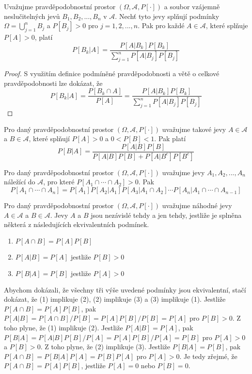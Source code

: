 \begin{theorem} 
Uvažujme pravděpodobnostní prostor $(\Omega, \mathscr{A}, P[\cdot])$ a soubor vzájemně neslučitelných jevů $B_1, B_2, ..., B_n$ v $\mathscr{A}$. Nechť tyto jevy splňují podmínky $\Omega = \bigcup_{j=1}^n B_j$ a $P[B_j] > 0$ pro $j = 1, 2, ..., n$. Pak pro každé $A \in \mathscr{A}$, které splňuje  $P[A] > 0$, platí
\begin{equation*}
P[B_k|A]=\frac{P[A|B_k]P[B_k]}{\sum_{j=1}^nP[A|B_j]P[B_j]}
\end{equation*}
\begin{proof}
S využitím definice podmíněné pravděpodobnosti a větě o celkové pravděpodobnosti lze dokázat, že
\begin{equation*}
P[B_k|A]=\frac{P[B_k \cap A]}{P[A]} = \frac{P[A|B_k]P[B_k]}{\sum_{j=1}^nP[A|B_j]P[B_j]}
\end{equation*}
\end{proof}
\end{theorem}
\begin{corollary}
Pro daný pravděpodobnostní prostor $(\Omega, \mathscr{A},P[\cdot])$ uvažujme takové jevy $A \in \mathscr{A}$ a $B \in \mathscr{A}$, které splňují $P[A] > 0$ a $0 < P[B] < 1$. Pak platí
\begin{equation*}
P[B|A] = \frac{P[A|B]P[B]}{P[A|B]P[B]+P[A|B^c]P[B^c]}
\end{equation*}
\end{corollary}
\begin{theorem}
Pro daný pravděpodobnostní prostor $(\Omega, \mathscr{A}, P[\cdot])$ uvažujme jevy $A_1, A_2, ..., A_n$ náležící do $\mathscr{A}$, pro které $P[A_1 \cap \cdots \cap A_2] > 0$. Pak
\begin{equation*}
P[A_1 \cap \cdots \cap A_n] = P[A_1]P[A_2|A_1]P[A_3| A_1 \cap A_2] \cdots P[A_n|A_1 \cap \cdots \cap A_{n-1}]
\end{equation*}
\end{theorem}
\begin{theorem}
Pro daný pravděpodobnostní prostor $(\Omega, \mathscr{A}, P[\cdot])$ uvažujme náhodné jevy $A \in \mathscr{A}$ a $B \in \mathscr{A}$. Jevy $A$ a $B$ jsou nezávislé tehdy a jen tehdy, jestliže je splněna některá z následujících ekvivalentních podmínek.
\begin{enumerate}
\item $P[A \cap B] = P[A]P[B]$
\item $P[A | B] = P[A]$ jestliže $P[B] > 0$
\item $P[B | A] = P[B]$ jestliže $P[A] > 0$
\end{enumerate}
\end{theorem}
Abychom dokázali, že všechny tři výše uvedené podmínky jsou ekvivalentní, stačí dokázat, že (1) implikuje (2), (2) implikuje (3) a (3) implikuje (1). Jestliže $P[A \cap B] = P[A]P[B]$, pak $P[A|B] = P[A \cap B] / P[B] = P[A]P[B]/P[B] = P[A]$ pro $P[B] > 0$. Z toho plyne, že (1) implikuje (2). Jestliže $P[A|B] = P[A]$, pak $P[B|A]=P[A|B]P[B]/P[A]=P[A]P[B]/P[A]=P[B]$ pro $P[A]>0$ a $P[B]>0$. Z toho plyne, že (2) implikuje (3). Jestliže $P[B|A]=P[B]$, pak $P[A \cap B] = P[B|A]P[A] = P[B]P[A]$ pro $P[A]>0$. Je tedy zřejmé, že $P[A \cap B] = P[A]P[B]$, jestliže $P[A] = 0$ nebo $P[B]=0$.

